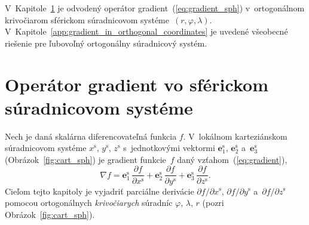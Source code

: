 \documentclass[a4paper,12pt]{book}
\let\vec\mathbf
\begin{document}
V~Kapitole~\ref{app:gradient_in_spherical_coordinates} je odvodený operátor 
gradient~(\ref{eq:gradient_sph}) v~ortogonálnom krivočiarom sférickom 
súradnicovom systéme~$(r, \varphi, \lambda)$.  
V~Kapitole~\ref{app:gradient_in_orthogonal_coordinates} je uvedené všeobecné 
riešenie pre ľubovoľný ortogonálny súradnicový systém.



\section{Operátor gradient vo sférickom súradnicovom systéme}
\label{app:gradient_in_spherical_coordinates}

Nech je daná skalárna diferencovateľná funkcia $f$.  V~lokálnom karteziánskom 
súradnicovom systéme $x^{\mathrm{s}}$, $y^{\mathrm{s}}$, $z^{\mathrm{s}}$ 
s~jednotkovými vektormi $\vec e^\mathrm{s}_1$, $\vec e^\mathrm{s}_2$ a~$\vec 
e^\mathrm{s}_3$ (Obrázok~\ref{fig:cart_sph}) je gradient funkcie~$f$ daný 
vzťahom~(\ref{eq:gradient}),
%
\begin{equation}
\nabla f = \vec e^\mathrm{s}_1 \, \frac{\partial f}{\partial x^{\mathrm{s}}} 
+ \vec e^\mathrm{s}_2 \, \frac{\partial f}{\partial y^{\mathrm{s}}} + \vec 
e^\mathrm{s}_3 \, \frac{\partial f}{\partial z^{\mathrm{s}}}{.}
\end{equation}
%
Cieľom tejto kapitoly je vyjadriť parciálne derivácie $\partial f \slash 
\partial x^{\mathrm{s}}$, $\partial f \slash \partial y^{\mathrm{s}}$ 
a~$\partial f \slash \partial z^{\mathrm{s}}$ pomocou ortogonálnych 
\emph{krivočiarych} súradníc $\varphi$, $\lambda$, $r$ (pozri 
Obrázok~\ref{fig:cart_sph}).
\end{document}
